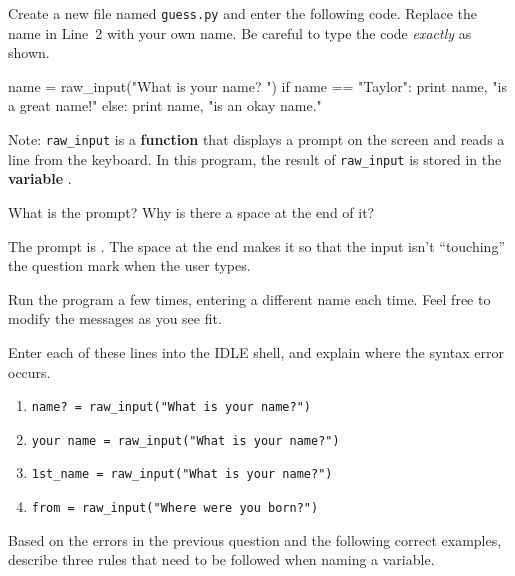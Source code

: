 
Create a new file named \texttt{guess.py} and enter the following code.
Replace the name in Line~2 with your own name.
Be careful to type the code \emph{exactly} as shown.

\begin{pythbox}
name = raw_input("What is your name? ")
if name == "Taylor":
    print name, "is a great name!"
else:
    print name, "is an okay name."
\end{pythbox}

Note: \verb|raw_input| is a \textbf{function} that displays a prompt on the screen and reads a line from the keyboard.
In this program, the result of \verb|raw_input| is stored in the \textbf{variable} .




\Q What is the prompt? Why is there a space at the end of it?

\begin{answer}
The prompt is .
The space at the end makes it so that the input isn't ``touching'' the question mark when the user types.
\end{answer}


\Q Run the program a few times, entering a different name each time. Feel free to modify the messages as you see fit.

\vspace{1em}


\Q Enter each of these lines into the IDLE shell, and explain where the syntax error occurs.

\begin{enumerate}
\item \verb|name? = raw_input("What is your name?")|

\item \verb|your name = raw_input("What is your name?")|

\item \verb|1st_name = raw_input("What is your name?")|

\item \verb|from = raw_input("Where were you born?")|
\end{enumerate}


\Q Based on the errors in the previous question and the following correct examples, describe three rules that need to be followed when naming a variable.


